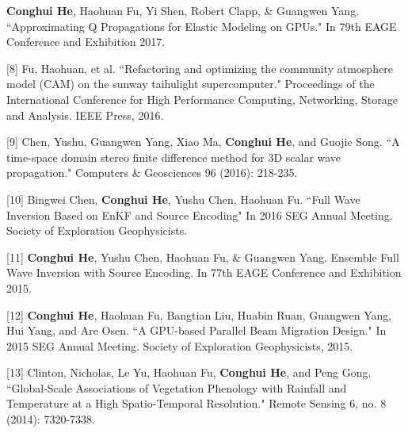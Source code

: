 \documentclass[11pt, a4paper]{awesome-cv}
\begin{document}
\begin{cvparagraph}
[7] \hspace{0.5mm} \textbf{Conghui He}, Haohuan Fu, Yi Shen, Robert Clapp, \& Guangwen Yang. ``Approximating Q Propagations for Elastic Modeling on GPUs." In 79th EAGE Conference and Exhibition 2017.

[8] \hspace{0.5mm} Fu, Haohuan, et al. ``Refactoring and optimizing the community atmosphere model (CAM) on the sunway taihulight supercomputer." Proceedings of the International Conference for High Performance Computing, Networking, Storage and Analysis. IEEE Press, 2016.

[9] \hspace{0.5mm} Chen, Yushu, Guangwen Yang, Xiao Ma, \textbf{Conghui He}, and Guojie Song. ``A time-space domain stereo finite difference method for 3D scalar wave propagation." Computers \& Geosciences 96 (2016): 218-235.

[10] \hspace{0.5mm} Bingwei Chen, \textbf{Conghui He}, Yushu Chen, Haohuan Fu. ``Full Wave Inversion Based on EnKF and Source Encoding" In 2016 SEG Annual Meeting. Society of Exploration Geophysicists.

[11] \hspace{0.5mm} \textbf{Conghui He}, Yushu Chen, Haohuan Fu, \& Guangwen Yang. Ensemble Full Wave Inversion with Source Encoding. In 77th EAGE Conference and Exhibition 2015.

[12] \hspace{0.5mm} \textbf{Conghui He}, Haohuan Fu, Bangtian Liu, Huabin Ruan, Guangwen Yang, Hui Yang, and Are Osen. ``A GPU-based Parallel Beam Migration Design." In 2015 SEG Annual Meeting. Society of Exploration Geophysicists, 2015.

[13] \hspace{0.5mm} Clinton, Nicholas, Le Yu, Haohuan Fu, \textbf{Conghui He}, and Peng Gong. ``Global-Scale Associations of Vegetation Phenology with Rainfall and Temperature at a High Spatio-Temporal Resolution." Remote Sensing 6, no. 8 (2014): 7320-7338.
\end{cvparagraph}


\end{document}
